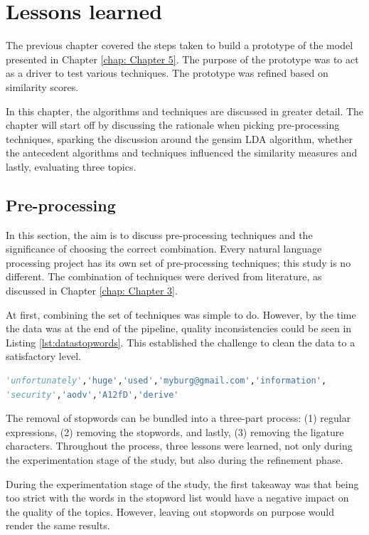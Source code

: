 \chapter{Lessons learned}
\label{chap: Chapter 7}

The previous chapter covered the steps taken to build a prototype of the model presented in Chapter \ref{chap: Chapter 5}. The purpose of the prototype was to act as a driver to test various techniques. The prototype was refined based on similarity scores. 

In this chapter, the algorithms and techniques are discussed in greater detail. The chapter will start off by discussing the rationale when picking pre-processing techniques, sparking the discussion around the gensim LDA algorithm, whether the antecedent algorithms and techniques influenced the similarity measures and lastly, evaluating three topics.


\section{Pre-processing}

In this section, the aim is to discuss pre-processing techniques and the significance of choosing the correct combination. Every natural language processing project has its own set of pre-processing techniques; this study is no different. The combination of techniques were derived from literature, as discussed in Chapter \ref{chap: Chapter 3}.

At first, combining the set of techniques was simple to do. However, by the time the data was at the end of the pipeline, quality inconsistencies could be seen in Listing \ref{lst:datastopwords}. This established the challenge to clean the data to a satisfactory level.

\begin{lstlisting}[language=Python, label={lst:datastopwords}, caption=Custom list of stopwords]
'unfortunately','huge','used','myburg@gmail.com','information',
'security','aodv','A12fD','derive'
\end{lstlisting}

The removal of stopwords can be bundled into a three-part process: (1) regular expressions, (2) removing the stopwords, and lastly, (3) removing the ligature characters. Throughout the process, three lessons were learned, not only during the experimentation stage of the study, but also during the refinement phase.

During the experimentation stage of the study, the first takeaway was that being too strict with the words in the stopword list would have a negative impact on the quality of the topics. However, leaving out stopwords on purpose would render the same results.

